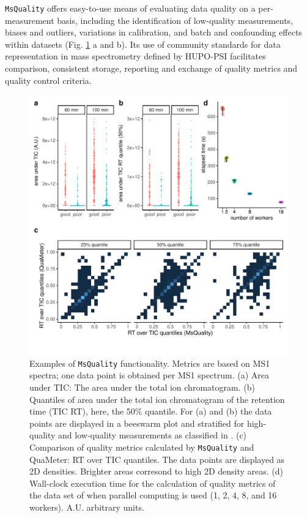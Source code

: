 \documentclass{bioinfo}
\begin{document}
\texttt{MsQuality} offers easy-to-use means of evaluating data quality on a
per-measurement basis, including the identification of low-quality measurements,
biases and outliers, variations in calibration, and batch and confounding effects within
datasets (Fig. \ref{fig:fig1} a and b). Its use of community standards for data
representation in mass spectrometry defined by HUPO-PSI facilitates comparison, 
consistent
storage, reporting and exchange of quality metrics and quality control criteria.

\begin{figure}
    \centering
 	\includegraphics[scale=0.421, clip, trim=0 37 0 5, scale = 0.9]{figure-main}
 	  \caption{Examples of \texttt{MsQuality} functionality. Metrics are based
 	        on MS1 spectra; one data point is obtained per MS1 spectrum.
 	        (a) Area under TIC: The area under the total ion chromatogram. 
            (b) Quantiles of area under the total ion
                chromatogram of the retention time (TIC RT), here, the 50\% quantile. 
  	      For (a) and (b) the data points are displayed 
                in a beeswarm plot and stratified for high-quality and low-quality
                measurements as classified in \cite{Amidan2014}.
            (c) Comparison of quality metrics calculated by \texttt{MsQuality} 
                and QuaMeter: RT over TIC quantiles. The
	      data points are displayed as 2D densities. Brighter areas corresond to
               high 2D density areas.
            (d) Wall-clock execution time for the calculation of quality metrics of the 
                data set of \cite{Amidan2014} when parallel computing is used 
                (1, 2, 4, 8, and 16 workers). A.U. arbitrary units.
    } \label{fig:fig1}
\end{figure}
\end{document}
